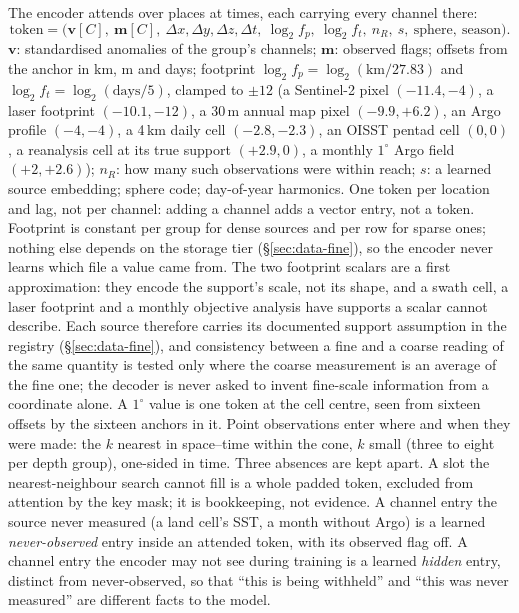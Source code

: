 \documentclass[10pt]{article}
\begin{document}
The encoder attends over places at times, each carrying every channel there:
\begin{equation}
\text{token}=\big(\mathbf{v}[C],\ \mathbf{m}[C],\ \Delta x,\Delta y,\Delta z,
\Delta t,\ \log_2 f_p,\ \log_2 f_t,\ n_R,\ s,\ \text{sphere},\ \text{season}\big).
\end{equation}
$\mathbf{v}$: standardised anomalies of the group's channels; $\mathbf{m}$:
observed flags; offsets from the anchor in km, m and days; footprint
$\log_2 f_p=\log_2(\text{km}/27.83)$ and $\log_2 f_t=\log_2(\text{days}/5)$,
clamped to $\pm12$ (a Sentinel-2 pixel $(-11.4,-4)$, a laser footprint
$(-10.1,-12)$, a 30\,m annual map pixel $(-9.9,+6.2)$, an Argo profile
$(-4,-4)$, a 4\,km daily cell $(-2.8,-2.3)$, an OISST pentad cell $(0,0)$, a
reanalysis cell at its true support $(+2.9,0)$, a monthly $1^\circ$ Argo
field $(+2,+2.6)$); $n_R$: how many such observations were within reach;
$s$: a learned source embedding; sphere code; day-of-year harmonics. One
token per location and lag, not per channel: adding a channel adds a vector
entry, not a token. Footprint is constant per group for dense sources and
per row for sparse ones; nothing else depends on the storage tier (\S\ref{sec:data-fine}), so the encoder
never learns which file a value came from. The two footprint scalars are a
first approximation: they encode the support's scale, not its shape, and a
swath cell, a laser footprint and a monthly objective analysis have supports
a scalar cannot describe. Each source therefore carries its documented support
assumption in the registry (\S\ref{sec:data-fine}), and consistency between a
fine and a coarse reading of the same quantity is tested only where the
coarse measurement is an average of the fine one; the decoder is never asked
to invent fine-scale information from a coordinate alone. A $1^\circ$ value
is one token at the cell centre, seen from sixteen offsets by the sixteen
anchors in it. Point observations enter where and when they were made: the
$k$ nearest in space--time within the cone, $k$ small (three to eight per
depth group), one-sided in time. Three absences are kept apart. A slot the
nearest-neighbour search cannot fill is a whole padded token, excluded from
attention by the key mask; it is bookkeeping, not evidence. A channel entry
the source never measured (a land cell's SST, a month without Argo) is a
learned \emph{never-observed} entry inside an attended token, with its
observed flag off. A channel entry the encoder may not see during training
is a learned \emph{hidden} entry, distinct from never-observed, so that
``this is being withheld'' and ``this was never measured'' are different
facts to the model.
\end{document}
